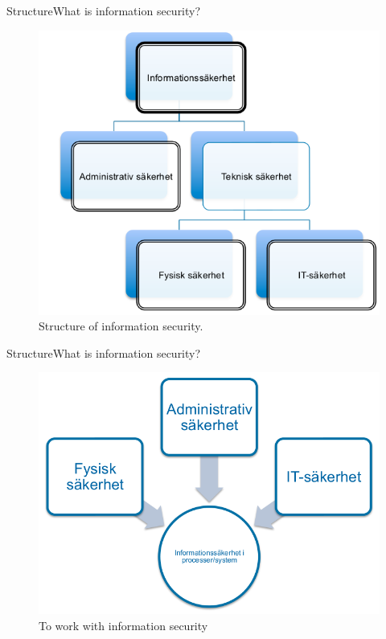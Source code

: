 \documentclass{beamer}
\begin{document}
\begin{frame}{Structure}{What is information security?}
  \begin{figure}
    \includegraphics[height=0.7\textheight]{Figures/infosak-struktur.png}
    \caption{Structure of information security.}
  \end{figure}
\end{frame}

\begin{frame}{Structure}{What is information security?}
  \begin{figure}
    \includegraphics[height=0.7\textheight]{Figures/infosak-process.png}
    \caption{To work with information security}
  \end{figure}
\end{frame}
\end{document}
